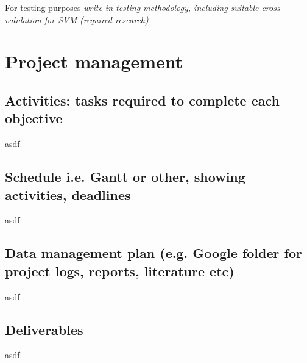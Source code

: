 \documentclass[12pt]{article}
\begin{document}
For testing purposes \textit{write in testing methodology, including suitable cross-validation for SVM (required research)}



\section{Project management}
\subsection{Activities: tasks required to complete each objective}
asdf
\subsection{Schedule i.e. Gantt or other, showing activities, deadlines}
asdf
\subsection{Data management plan (e.g. Google folder for project logs, reports, literature etc)}
asdf
\subsection{Deliverables}
asdf



\pagebreak

\printglossary[type=\acronymtype]
\printglossary

\pagebreak



\end{document}
